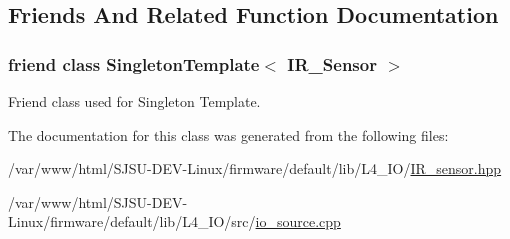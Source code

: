 \subsection{Friends And Related Function Documentation}
\subsubsection[{\texorpdfstring{Singleton\+Template$<$ I\+R\+\_\+\+Sensor $>$}{SingletonTemplate< IR_Sensor >}}]{\setlength{\rightskip}{0pt plus 5cm}friend class {\bf Singleton\+Template}$<$ {\bf I\+R\+\_\+\+Sensor} $>$\hspace{0.3cm}{\ttfamily [friend]}}\hypertarget{classIR__Sensor_ab53cf421ebbd5018a3e945bb6368f90e}{}\label{classIR__Sensor_ab53cf421ebbd5018a3e945bb6368f90e}


Friend class used for Singleton Template. 



The documentation for this class was generated from the following files\+:\begin{DoxyCompactItemize}
\item 
/var/www/html/\+S\+J\+S\+U-\/\+D\+E\+V-\/\+Linux/firmware/default/lib/\+L4\+\_\+\+I\+O/\hyperlink{IR__sensor_8hpp}{I\+R\+\_\+sensor.\+hpp}\item 
/var/www/html/\+S\+J\+S\+U-\/\+D\+E\+V-\/\+Linux/firmware/default/lib/\+L4\+\_\+\+I\+O/src/\hyperlink{io__source_8cpp}{io\+\_\+source.\+cpp}\end{DoxyCompactItemize}
